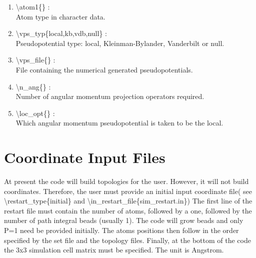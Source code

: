 \documentclass[12pt,titlepage]{article}
\begin{document}
\begin{enumerate}

 \vspace{0.15in} 
 \item  \textbackslash atom1\{\} : \\
    Atom type in character data.

 \vspace{0.15in} 
 \item  \textbackslash vps\_typ\{local,kb,vdb,null\} : \\
    Pseudopotential type: local, Kleinman-Bylander, Vanderbilt or null.

 \vspace{0.15in} 
 \item  \textbackslash vps\_file\{\} : \\
    File containing the numerical generated pseudopotentials.

 \vspace{0.15in} 
 \item  \textbackslash n\_ang\{\} : \\
    Number of angular momentum projection operators required.

 \vspace{0.15in} 
 \item  \textbackslash loc\_opt\{\} : \\
    Which angular momentum pseudopotential is taken to be the local.

\end{enumerate}

\newpage

\section{\bf Coordinate Input Files} 

At present the code will build topologies for the user. However,
it will not build coordinates. Therefore, the user must provide
an initial input coordinate file( see \textbackslash restart\_type\{initial\}
and \textbackslash in\_restart\_file\{sim\_restart.in\})
The first line of the restart file must contain the number of atoms,
followed by a one, followed by the number of path integral beads 
(usually 1). The code will grow beads and only P=1 need be provided
initially. The atoms positions then follow in the order specified by
the set file and the topology files. Finally, at the bottom of
the code the 3x3 simulation cell matrix must be specified.
The unit is Angstrom.
\end{document}
